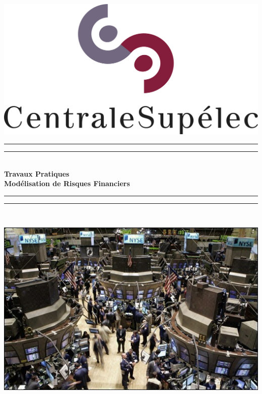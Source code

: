 \begin{titlepage}
\begin{center}


\includegraphics[scale=0.4]{./img/logo_centralesup.jpg} \\[1.5cm]



\vfill
\rule{\textwidth}{1.6pt}\vspace*{-\baselineskip}\vspace*{2pt} %
\rule{\textwidth}{0.4pt}\\[\baselineskip] %
{ \huge \bfseries Travaux Pratiques \\ Modélisation de Risques Financiers \\[0.4cm] }
\rule{\textwidth}{0.4pt}\vspace*{-\baselineskip}\vspace{3.2pt} %
\rule{\textwidth}{1.6pt}\\[1.5cm] %

\vfill

\includegraphics[scale=0.8]{./img/bolsa} \\[1.5cm]


\end{center}
\end{titlepage}
